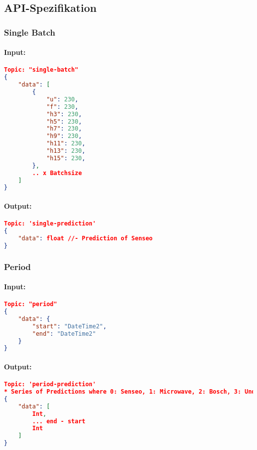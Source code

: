     \subsection{API-Spezifikation}
        \subsubsection{Single Batch}
        \paragraph{Input:}

            \begin{lstlisting}[language=json,firstnumber=1]
Topic: "single-batch"
{
    "data": [
        {
            "u": 230,
            "f": 230,
            "h3": 230,
            "h5": 230,
            "h7": 230,
            "h9": 230,
            "h11": 230,
            "h13": 230,
            "h15": 230,
        },
        .. x Batchsize
    ]
}
            \end{lstlisting}
        
            \paragraph{Output:}
        
            \begin{lstlisting}[language=json,firstnumber=1]
Topic: 'single-prediction'
{
    "data": float //- Prediction of Senseo
}
            \end{lstlisting}
    
        \subsubsection{Period}
            \paragraph{Input:}
    
                \begin{lstlisting}[language=json,firstnumber=1]
Topic: "period"
{
    "data": {
        "start": "DateTime2",
        "end": "DateTime2"
    }
}
                \end{lstlisting}
            
                \paragraph{Output:}
            
                \begin{lstlisting}[language=json,firstnumber=1]
Topic: 'period-prediction'
* Series of Predictions where 0: Senseo, 1: Microwave, 2: Bosch, 3: Undefined, for every second
{
    "data": [
        Int,
        ... end - start
        Int
    ]
}
                \end{lstlisting}
